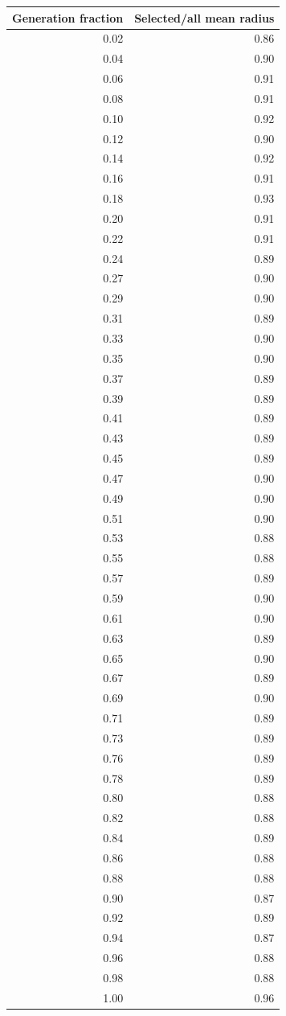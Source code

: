 \begin{tabular}{rr}
\toprule
Generation fraction & Selected/all mean radius \\
\midrule
0.02 & 0.86 \\
0.04 & 0.90 \\
0.06 & 0.91 \\
0.08 & 0.91 \\
0.10 & 0.92 \\
0.12 & 0.90 \\
0.14 & 0.92 \\
0.16 & 0.91 \\
0.18 & 0.93 \\
0.20 & 0.91 \\
0.22 & 0.91 \\
0.24 & 0.89 \\
0.27 & 0.90 \\
0.29 & 0.90 \\
0.31 & 0.89 \\
0.33 & 0.90 \\
0.35 & 0.90 \\
0.37 & 0.89 \\
0.39 & 0.89 \\
0.41 & 0.89 \\
0.43 & 0.89 \\
0.45 & 0.89 \\
0.47 & 0.90 \\
0.49 & 0.90 \\
0.51 & 0.90 \\
0.53 & 0.88 \\
0.55 & 0.88 \\
0.57 & 0.89 \\
0.59 & 0.90 \\
0.61 & 0.90 \\
0.63 & 0.89 \\
0.65 & 0.90 \\
0.67 & 0.89 \\
0.69 & 0.90 \\
0.71 & 0.89 \\
0.73 & 0.89 \\
0.76 & 0.89 \\
0.78 & 0.89 \\
0.80 & 0.88 \\
0.82 & 0.88 \\
0.84 & 0.89 \\
0.86 & 0.88 \\
0.88 & 0.88 \\
0.90 & 0.87 \\
0.92 & 0.89 \\
0.94 & 0.87 \\
0.96 & 0.88 \\
0.98 & 0.88 \\
1.00 & 0.96 \\
\bottomrule
\end{tabular}

